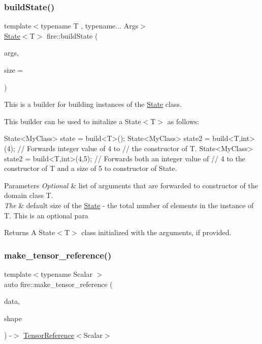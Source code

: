 \subsubsection{\texorpdfstring{build\+State()}{buildState()}}
{\footnotesize\ttfamily template$<$typename T , typename... Args$>$ \\
\hyperlink{a00818}{State}$<$T$>$ fire\+::build\+State (\begin{DoxyParamCaption}\item[{Args \&\&...}]{args,  }\item[{const long \&}]{size = {} }\end{DoxyParamCaption})}

This is a builder for building instances of the \hyperlink{a00818}{State} class.

This builder can be used to initalize a State$<$\+T$>$ as follows\+: 
\begin{DoxyCode}
State<MyClass> state = build<T>();
State<MyClass> state2 = build<T,int>(4); \textcolor{comment}{// Forwards integer value of 4 to}
\textcolor{comment}{// the constructor of T.}
State<MyClass> state2 = build<T,int>(4,5); \textcolor{comment}{// Forwards both an integer value of}
\textcolor{comment}{// 4 to the constructor of T and a size of 5 to constructor of State.}
\end{DoxyCode}



\begin{DoxyParams}{Parameters}
{\em Optional} & list of arguments that are forwarded to constructor of the domain class T. \\
\hline
{\em The} & default size of the \hyperlink{a00818}{State} -\/ the total number of elements in the instance of T. This is an optional para \\
\hline
\end{DoxyParams}
\begin{DoxyReturn}{Returns}
A State$<$\+T$>$ class initialized with the arguments, if provided. 
\end{DoxyReturn}
\mbox{\label{a00171_aaab26473f8b0cb78cff67ae06ff7ce80}} 
\subsubsection{\texorpdfstring{make\+\_\+tensor\+\_\+reference()}{make\_tensor\_reference()}}
{\footnotesize\ttfamily template$<$typename Scalar $>$ \\
auto fire\+::make\+\_\+tensor\+\_\+reference (\begin{DoxyParamCaption}\item[{Scalar $\ast$}]{data,  }\item[{\hyperlink{a00850}{Tensor\+Shape} \&}]{shape }\end{DoxyParamCaption}) -\/$>$ \hyperlink{a00171_a1bf491fd1c876e2808648b2fd291e3dd}{Tensor\+Reference}$<$Scalar$>$ }

